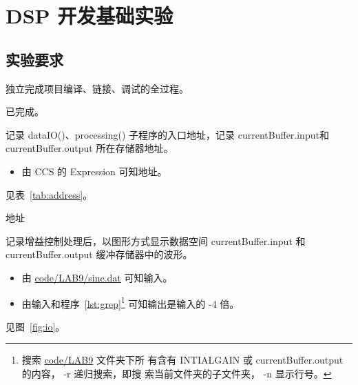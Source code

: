 \documentclass[../main]{subfiles}
\begin{document}
\chapter{DSP 开发基础实验}%
\label{cha:test}

\section{实验要求}%
\label{sec:\arabic{chapter}requirement}

\begin{Exercise}
  独立完成项目编译、链接、调试的全过程。
\end{Exercise}

\begin{Answer}
  已完成。
\end{Answer}

\begin{Exercise}
  记录 dataIO()、processing() 子程序的入口地址，记录 currentBuffer.input和
  currentBuffer.output 所在存储器地址。
\end{Exercise}

\begin{Answer}
  \begin{itemize}
    \item 由 CCS 的 Expression 可知地址。
  \end{itemize}
  见表~\ref{tab:address}。
\end{Answer}

\begin{table}[htbp]
  \centering
  \caption{地址}%
  \label{tab:address}
\end{table}

\begin{Exercise}
  记录增益控制处理后，以图形方式显示数据空间 currentBuffer.input 和
  currentBuffer.output 缓冲存储器中的波形。
\end{Exercise}

\begin{Answer}
  \begin{itemize}
    \item 由 \url{code/LAB9/sine.dat} 可知输入。
    \item 由输入和程序~\ref{lst:grep}\footnote{搜索 \url{code/LAB9} 文件夹下所
        有含有 INTIALGAIN 或 currentBuffer.output 的内容， -r 递归搜索，即搜
        索当前文件夹的子文件夹， -n 显示行号。} 可知输出是输入的 -4 倍。
  \end{itemize}
  见图~\ref{fig:io}。
\end{Answer}
\end{document}
